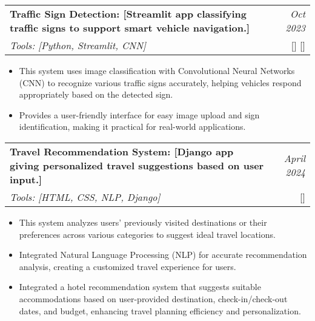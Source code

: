 \documentclass[a4paper,11pt]{article}
\makeatletter
\newcommand{\resumeProject}[4]{
\vspace{0.5mm}\item
    \begin{tabular*}{0.98\textwidth}[t]{l@{\extracolsep{\fill}}r}
        \textbf{#1} & \textit{\footnotesize{#3}} \\
        \footnotesize{\textit{#2}} & \footnotesize{#4}
    \end{tabular*}
    \vspace{-2.4mm}
}
\newcommand{\resumeItemListStart}{\begin{itemize}[leftmargin=*,labelsep=1mm,itemsep=0.5mm]}
\newcommand{\resumeItemListEnd}{\end{itemize}\vspace{-2mm}}
\makeatother
\begin{document}
\resumeProject
  {Traffic Sign Detection: [Streamlit app classifying traffic signs to support smart vehicle navigation.]}
  {Tools: [Python, Streamlit, CNN]}
  {Oct 2023}
  {{
    [\href{https://github.com/Lns9777/Traffic-Light-Detection}{\textcolor{darkblue}{\faGithub}}]
    [\href{https://traffic-sign-detection-lns.streamlit.app/}{\textcolor{darkblue}{\faLink}}]
  }}
\resumeItemListStart
    \item This system uses image classification with Convolutional Neural Networks (CNN) to recognize various traffic signs accurately, helping vehicles respond appropriately based on the detected sign.
    \item Provides a user-friendly interface for easy image upload and sign identification, making it practical for real-world applications.
\resumeItemListEnd

\resumeProject
  {Travel Recommendation System: [Django app giving personalized travel suggestions based on user input.]}
  {Tools: [HTML, CSS, NLP, Django]}
  {April 2024}
  {{
    [\href{https://github.com/Lns9777/Travel-Recommendation-System-Using-Django}{\textcolor{darkblue}{\faGithub}}]
  }}
\resumeItemListStart
    \item This system analyzes users' previously visited destinations or their preferences across various categories to suggest ideal travel locations.
    \item Integrated Natural Language Processing (NLP) for accurate recommendation analysis, creating a customized travel experience for users.
    \item Integrated a hotel recommendation system that suggests suitable accommodations based on user-provided destination, check-in/check-out dates, and budget, enhancing travel planning efficiency and personalization.
\resumeItemListEnd
\end{document}
